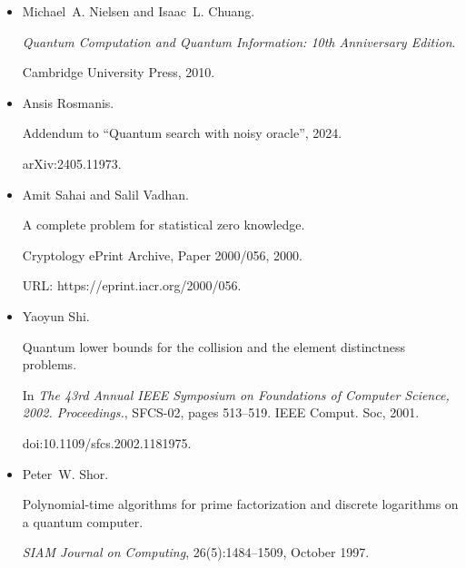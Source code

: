 \documentclass[10pt,a4paper]{article}
\begin{document}
\begin{itemize}
Ashley Montanaro.


Nonadaptive quantum query complexity, 2010.


arXiv:1001.0018.





\item[] 
[25]

Michael A. Nielsen and Isaac L. Chuang.


\emph{Quantum Computation and Quantum Information: 10th Anniversary
Edition}.


Cambridge University Press, 2010.





\item[] 
[26]

Ansis Rosmanis.


Addendum to “Quantum search with noisy oracle”, 2024.


arXiv:2405.11973.





\item[] 
[27]

Amit Sahai and Salil Vadhan.


A complete problem for statistical zero knowledge.


Cryptology ePrint Archive, Paper 2000/056, 2000.


URL: https://eprint.iacr.org/2000/056.





\item[] 
[28]

Yaoyun Shi.


Quantum lower bounds for the collision and the element distinctness
problems.


In \emph{The 43rd Annual IEEE Symposium on Foundations of Computer
Science, 2002. Proceedings.}, SFCS-02, pages 513–519. IEEE Comput. Soc,
2001.


doi:10.1109/sfcs.2002.1181975.





\item[] 
[29]

Peter W. Shor.


Polynomial-time algorithms for prime factorization and discrete
logarithms on a quantum computer.


\emph{SIAM Journal on Computing}, 26(5):1484–1509, October 1997.



\end{itemize}
\end{document}
